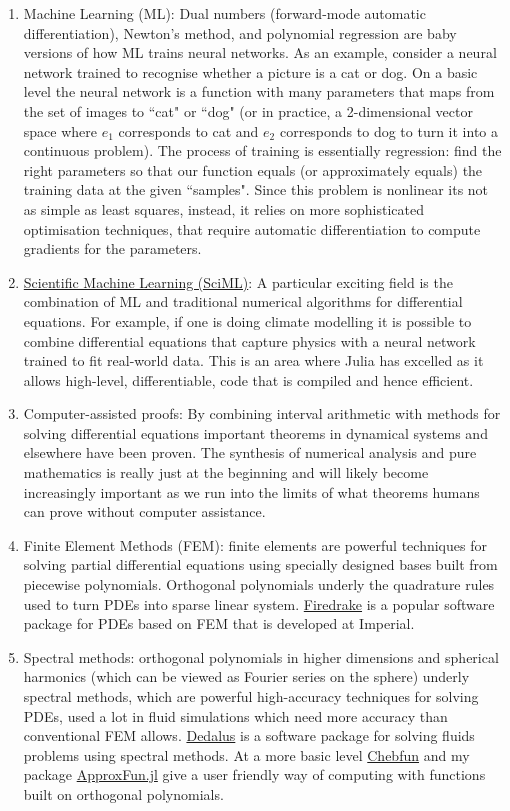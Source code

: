 \documentclass[12pt,a4paper]{book}
\theoremstyle{definition}
\begin{document}
\begin{enumerate}
\item Machine Learning (ML): Dual numbers (forward-mode automatic differentiation), Newton's method, and polynomial regression
 are baby versions of how ML trains neural networks.  As an example, consider a neural network trained to recognise whether a picture
 is a cat or dog. On a basic level the neural network is a function with many parameters that maps from the set of images to ``cat" or ``dog" (or in practice, a 2-dimensional vector space where $e_1$ corresponds to cat and $e_2$ corresponds to dog to turn it into a continuous problem).
 The process of training is essentially regression: find the right parameters so that our function equals (or approximately equals) the
 training data at the given ``samples". Since this problem is nonlinear its not as simple as least squares, instead, it relies on more sophisticated
 optimisation techniques, that require automatic differentiation to compute gradients for the parameters.
\item \href{https://sciml.ai}{Scientific Machine Learning (SciML)}: A particular exciting field is the combination of ML and traditional numerical algorithms for differential equations.
For example, if one is doing climate modelling it is possible to combine differential equations that capture physics with a neural network  trained to
fit real-world data. This is an area where Julia has excelled as it allows high-level, differentiable, code that is compiled and hence efficient.
 \item Computer-assisted proofs: By combining interval arithmetic with methods for solving differential equations important theorems in dynamical
 systems and elsewhere have been proven. The synthesis of numerical analysis and pure mathematics is really just at the beginning and will likely
 become increasingly important as we run into the limits of what theorems humans can prove without computer assistance.
\item Finite Element Methods (FEM): finite elements are powerful techniques for solving partial differential
equations using specially designed bases built from piecewise polynomials. Orthogonal polynomials underly the quadrature rules  used to turn PDEs into
sparse linear system. \href{https://www.firedrakeproject.org}{Firedrake} is a popular software package for
PDEs based on FEM that is developed at Imperial.
\item Spectral methods: orthogonal polynomials in higher dimensions and spherical harmonics (which can be viewed as Fourier series on the sphere)
underly spectral methods, which are powerful high-accuracy techniques for solving PDEs, used a lot in fluid simulations which
need more accuracy than conventional FEM allows. \href{https://dedalus-project.org}{Dedalus} is a software package for
solving fluids problems using spectral methods. At a more basic level \href{https://www.chebfun.org}{Chebfun} and my package
\href{https://github.com/JuliaApproximation/ApproxFun.jl}{ApproxFun.jl} give a user friendly way of computing with functions built
on orthogonal polynomials.
\end{enumerate}
\end{document}
